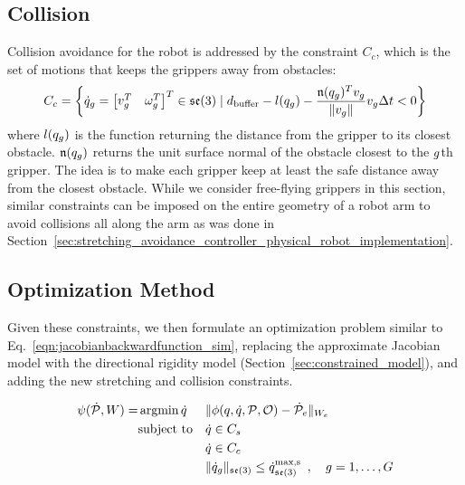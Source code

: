 \subsection{Collision} Collision avoidance for the robot is addressed by the constraint $C_c$, which is the set of motions that keeps the grippers away from obstacles:
\begin{equation}
    C_c = \left\{\dot{q}_g = \begin{bmatrix}v_g^T & \omega_g^T\end{bmatrix}^T \in \mathfrak{se}(3) \mid  d_\textrm{buffer} - l(q_g) - \frac{\mathfrak{n}(q_g)^T v_g}{\|v_g\|} v_g \Delta t < 0\right\}
    \label{Eq:Collision_constraint_Method}
\end{equation}
where $l(q_g)$ is the function returning the distance from the gripper to its closest obstacle. $\mathfrak{n}(q_g)$ returns the unit surface normal of the obstacle closest to the $g$th gripper. The idea is to make each gripper keep at least the safe distance away from the closest obstacle. While we consider free-flying grippers in this section, similar constraints can be imposed on the entire geometry of a robot arm to avoid collisions all along the arm as was done in Section~\ref{sec:stretching_avoidance_controller_physical_robot_implementation}.


\subsection{Optimization Method}

Given these constraints, we then formulate an optimization problem similar to Eq.~\eqref{eqn:jacobianbackwardfunction_sim}, replacing the approximate Jacobian model with the directional rigidity model (Section~\ref{sec:constrained_model}), and adding the new stretching and collision constraints.

\begin{equation}
\begin{aligned}
    \psi(\dot{\mathcal{P}}, W) = 
        & \operatorname*{argmin}{\dot{q}}
            & & \| \phi(q, \dot{q}, \mathcal{P}, \mathcal{O}) - \dot{\mathcal{P}}_e \|_{W_e} \\
        & \textrm{subject to}
            & & \dot{q} \in C_s\\
        &   & & \dot{q} \in C_c\\
        &   & & \| \dot{q}_g \|_{\mathfrak{se}(3)} \leq \dot{q}^\textrm{max,s}_{\mathfrak{se}(3)} \enspace, \quad g = 1, \dots, G
\end{aligned}
\label{Eq:Optimization Problem}
\end{equation}

